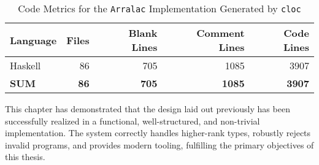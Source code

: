 \begin{table}[h!]
  \centering
  \footnotesize
  \caption{Code Metrics for the \texttt{Arralac} Implementation Generated by \texttt{cloc}}
  \begin{tabular}{lrrrr}
    \toprule
    \textbf{Language} & \textbf{Files} & \textbf{Blank Lines} & \textbf{Comment Lines} & \textbf{Code Lines} \\
    \midrule
    Haskell           & 86             & 705                  & 1085                   & 3907                \\
    \midrule
    \textbf{SUM}      & \textbf{86}    & \textbf{705}         & \textbf{1085}          & \textbf{3907}       \\
    \bottomrule
  \end{tabular}
  \label{table:cloc}
\end{table}

This chapter has demonstrated that the design laid out previously has been successfully realized in a functional, well-structured, and non-trivial implementation. The system correctly handles higher-rank types, robustly rejects invalid programs, and provides modern tooling, fulfilling the primary objectives of this thesis.